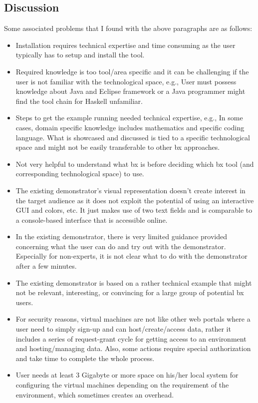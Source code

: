 \subsection{Discussion}\label{subsec:discussion}
Some associated problems that I found with the above paragraphs are as follows: 

\begin{itemize}
    \item {Installation requires technical expertise and time consuming as the user typically has to setup and install the tool.}
    
    \item {Required knowledge is too tool/area specific and it can be challenging if the user is not familiar with the technological space, e.g., User must possess knowledge about Java and Eclipse framework or a Java programmer might find the tool chain for Haskell unfamiliar.}

	\item {Steps to get the example running needed technical expertise, e.g., In some cases, domain specific knowledge includes mathematics and specific coding language. What is showcased and discussed is tied to a specific technological space and might not be easily transferable to other bx approaches.}
	
	\item {Not very helpful to understand what bx is before deciding which bx tool (and corresponding technological space) to use.}
	
	\item {The existing demonstrator's visual representation doesn't create interest in the target audience as it does not exploit the potential of using an interactive GUI and colors, etc. It just makes use of two text fields and is comparable to a console-based interface that is accessible online.}
	
	\item {In the existing demonstrator, there is very limited guidance provided concerning what the user can do and try out with the demonstrator. Especially for non-experts, it is not clear what to do with the demonstrator after a few minutes.}
	
	\item {The existing demonstrator is based on a rather technical example that might not be relevant, interesting, or convincing for a large group of potential bx users.}	
	
	\item {For security reasons, virtual machines are not like other web portals where a user need to simply sign-up and can host/create/access data, rather it includes a series of request-grant cycle for getting access to an environment and hosting/managing data. Also, some actions require special authorization and take time to complete the whole process.}
	
	\item {User needs at least 3 Gigabyte or more space on his/her local system for configuring the virtual machines depending on the requirement of the environment, which sometimes creates an overhead.}

\end{itemize}
